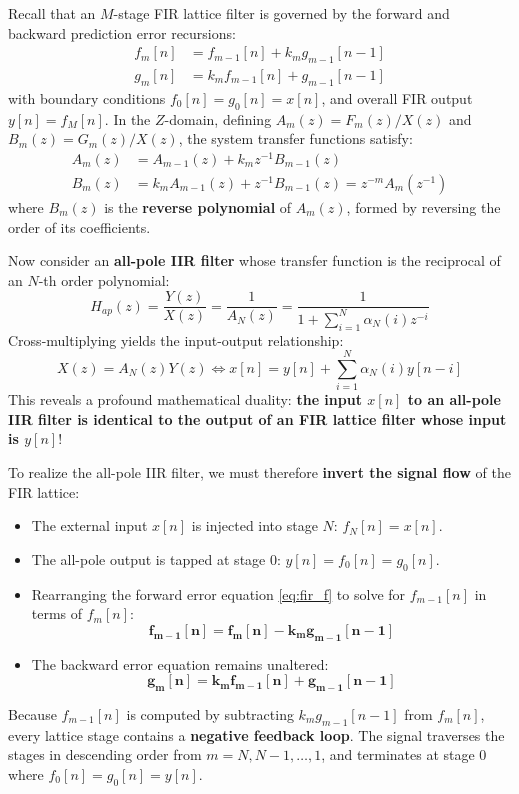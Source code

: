 \documentclass[11pt,a4paper]{article}
\begin{document}
Recall that an $M$-stage FIR lattice filter is governed by the forward and backward prediction error recursions:
\begin{align}
f_m[n] &= f_{m-1}[n] + k_m g_{m-1}[n-1] \label{eq:fir_f} \\
g_m[n] &= k_m f_{m-1}[n] + g_{m-1}[n-1] \label{eq:fir_g}
\end{align}
with boundary conditions $f_0[n] = g_0[n] = x[n]$, and overall FIR output $y[n] = f_M[n]$. In the $Z$-domain, defining $A_m(z) = F_m(z)/X(z)$ and $B_m(z) = G_m(z)/X(z)$, the system transfer functions satisfy:
\begin{align}
A_m(z) &= A_{m-1}(z) + k_m z^{-1} B_{m-1}(z) \label{eq:poly_A} \\
B_m(z) &= k_m A_{m-1}(z) + z^{-1} B_{m-1}(z) = z^{-m} A_m(z^{-1}) \label{eq:poly_B}
\end{align}
where $B_m(z)$ is the \textbf{reverse polynomial} of $A_m(z)$, formed by reversing the order of its coefficients.

Now consider an \textbf{all-pole IIR filter} whose transfer function is the reciprocal of an $N$-th order polynomial:
\begin{equation}
H_{ap}(z) = \frac{Y(z)}{X(z)} = \frac{1}{A_N(z)} = \frac{1}{1 + \sum_{i=1}^N \alpha_N(i) z^{-i}}
\label{eq:all_pole_Hz}
\end{equation}
Cross-multiplying yields the input-output relationship:
\begin{equation}
X(z) = A_N(z) Y(z) \iff x[n] = y[n] + \sum_{i=1}^N \alpha_N(i) y[n-i]
\end{equation}
This reveals a profound mathematical duality: \textbf{the input $x[n]$ to an all-pole IIR filter is identical to the output of an FIR lattice filter whose input is $y[n]$}!

To realize the all-pole IIR filter, we must therefore \textbf{invert the signal flow} of the FIR lattice:
\begin{itemize}
    \item The external input $x[n]$ is injected into stage $N$: $f_N[n] = x[n]$.
    \item The all-pole output is tapped at stage $0$: $y[n] = f_0[n] = g_0[n]$.
    \item Rearranging the forward error equation \eqref{eq:fir_f} to solve for $f_{m-1}[n]$ in terms of $f_m[n]$:
    \begin{equation}
    \mathbf{f_{m-1}[n] = f_m[n] - k_m g_{m-1}[n-1]}
    \label{eq:iir_f_inv}
    \end{equation}
    \item The backward error equation remains unaltered:
    \begin{equation}
    \mathbf{g_m[n] = k_m f_{m-1}[n] + g_{m-1}[n-1]}
    \label{eq:iir_g_inv}
    \end{equation}
\end{itemize}
Because $f_{m-1}[n]$ is computed by subtracting $k_m g_{m-1}[n-1]$ from $f_m[n]$, every lattice stage contains a \textbf{negative feedback loop}. The signal traverses the stages in descending order from $m = N, N-1, \dots, 1$, and terminates at stage 0 where $f_0[n] = g_0[n] = y[n]$.
\end{document}
